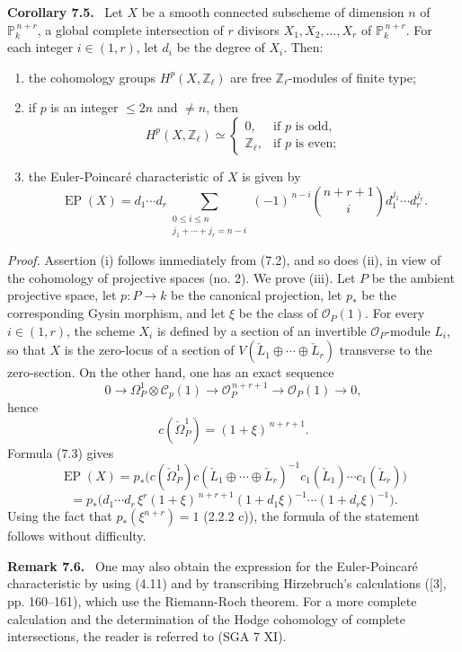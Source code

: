 \documentclass[11pt]{article}
\newenvironment{statement}[1]{\par\medskip\noindent\textbf{#1.}\ }{\par\medskip}
\begin{document}
\begin{statement}{Corollary 7.5}
Let $X$ be a smooth connected subscheme of dimension $n$ of $\mathbb P_k^{\,n+r}$, a global complete intersection of $r$ divisors $X_1,X_2,\ldots,X_r$ of $\mathbb P_k^{\,n+r}$. For each integer $i\in(1,r)$, let $d_i$ be the degree of $X_i$. Then:
\begin{enumerate}[label=(\roman*)]
\item the cohomology groups $H^p(X,\mathbb Z_\ell)$ are free $\mathbb Z_\ell$-modules of finite type;
\item if $p$ is an integer $\le 2n$ and $\ne n$, then
\[
H^p(X,\mathbb Z_\ell)\simeq
\begin{cases}
0,&\text{if }p\text{ is odd},\\
\mathbb Z_\ell,&\text{if }p\text{ is even};
\end{cases}
\]
\item the Euler-Poincaré characteristic of $X$ is given by
\[
\operatorname{EP}(X)
=d_1\cdots d_r
\sum_{\substack{0\le i\le n\\ j_1+\cdots+j_r=n-i}}
(-1)^{\,n-i}\binom{n+r+1}{i}
d_1^{j_1}\cdots d_r^{j_r}.
\]
\end{enumerate}
\end{statement}

\emph{Proof.} Assertion (i) follows immediately from (7.2), and so does (ii), in view of the cohomology of projective spaces (no. 2). We prove (iii). Let $P$ be the ambient projective space, let $p:P\to k$ be the canonical projection, let $p_*$ be the corresponding Gysin morphism, and let $\xi$ be the class of $\mathcal O_P(1)$. For every $i\in(1,r)$, the scheme $X_i$ is defined by a section of an invertible $\mathcal O_P$-module $L_i$, so that $X$ is the zero-locus of a section of $V(\check L_1\oplus\cdots\oplus\check L_r)$ transverse to the zero-section. On the other hand, one has an exact sequence
\[
0\to\Omega_P^1\otimes\mathcal C_p(1)\to\mathcal O_P^{\,n+r+1}\to\mathcal O_P(1)\to0,
\]
hence
\[
c(\check\Omega_P^1)=(1+\xi)^{\,n+r+1}.
\]
Formula (7.3) gives
\[
\operatorname{EP}(X)
=p_*\bigl(c(\check\Omega_P^1)c(\check L_1\oplus\cdots\oplus\check L_r)^{-1}
c_1(\check L_1)\cdots c_1(\check L_r)\bigr)
\]
\[
=p_*\bigl(d_1\cdots d_r\,\xi^r(1+\xi)^{\,n+r+1}
(1+d_1\xi)^{-1}\cdots(1+d_r\xi)^{-1}\bigr).
\]
Using the fact that $p_*(\xi^{n+r})=1$ (2.2.2 c)), the formula of the statement follows without difficulty.

\begin{statement}{Remark 7.6}
One may also obtain the expression for the Euler-Poincaré characteristic by using (4.11) and by transcribing Hirzebruch's calculations ([3], pp. 160--161), which use the Riemann-Roch theorem. For a more complete calculation and the determination of the Hodge cohomology of complete intersections, the reader is referred to (SGA 7 XI).
\end{statement}
\end{document}
